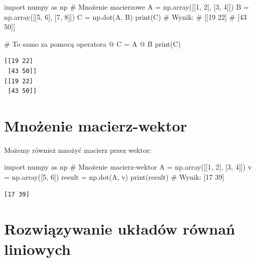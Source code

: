 \documentclass[
  letterpaper,
  DIV=11,
  numbers=noendperiod]{scrreprt}
\newenvironment{Shaded}{\begin{snugshade}}{\end{snugshade}}
\newcommand{\BuiltInTok}[1]{\textcolor[rgb]{0.00,0.23,0.31}{#1}}
\newcommand{\CommentTok}[1]{\textcolor[rgb]{0.37,0.37,0.37}{#1}}
\newcommand{\DecValTok}[1]{\textcolor[rgb]{0.68,0.00,0.00}{#1}}
\newcommand{\ImportTok}[1]{\textcolor[rgb]{0.00,0.46,0.62}{#1}}
\newcommand{\NormalTok}[1]{\textcolor[rgb]{0.00,0.23,0.31}{#1}}
\newcommand{\OperatorTok}[1]{\textcolor[rgb]{0.37,0.37,0.37}{#1}}
\begin{document}
\begin{Shaded}
\begin{Highlighting}[]
\ImportTok{import}\NormalTok{ numpy }\ImportTok{as}\NormalTok{ np}
\CommentTok{\# Mnożenie macierzowe}
\NormalTok{A }\OperatorTok{=}\NormalTok{ np.array([[}\DecValTok{1}\NormalTok{, }\DecValTok{2}\NormalTok{], [}\DecValTok{3}\NormalTok{, }\DecValTok{4}\NormalTok{]])}
\NormalTok{B }\OperatorTok{=}\NormalTok{ np.array([[}\DecValTok{5}\NormalTok{, }\DecValTok{6}\NormalTok{], [}\DecValTok{7}\NormalTok{, }\DecValTok{8}\NormalTok{]])}
\NormalTok{C }\OperatorTok{=}\NormalTok{ np.dot(A, B)}
\BuiltInTok{print}\NormalTok{(C)}
\CommentTok{\# Wynik:}
\CommentTok{\# [[19 22]}
\CommentTok{\#  [43 50]]}

\CommentTok{\# To samo za pomocą operatora @}
\NormalTok{C }\OperatorTok{=}\NormalTok{ A }\OperatorTok{@}\NormalTok{ B}
\BuiltInTok{print}\NormalTok{(C)}
\end{Highlighting}
\end{Shaded}

\begin{verbatim}
[[19 22]
 [43 50]]
[[19 22]
 [43 50]]
\end{verbatim}

\section{Mnożenie macierz-wektor}\label{mnoux17cenie-macierz-wektor}

Możemy również mnożyć macierz przez wektor:

\begin{Shaded}
\begin{Highlighting}[]
\ImportTok{import}\NormalTok{ numpy }\ImportTok{as}\NormalTok{ np}
\CommentTok{\# Mnożenie macierz{-}wektor}
\NormalTok{A }\OperatorTok{=}\NormalTok{ np.array([[}\DecValTok{1}\NormalTok{, }\DecValTok{2}\NormalTok{], [}\DecValTok{3}\NormalTok{, }\DecValTok{4}\NormalTok{]])}
\NormalTok{v }\OperatorTok{=}\NormalTok{ np.array([}\DecValTok{5}\NormalTok{, }\DecValTok{6}\NormalTok{])}
\NormalTok{result }\OperatorTok{=}\NormalTok{ np.dot(A, v)}
\BuiltInTok{print}\NormalTok{(result)  }\CommentTok{\# Wynik: [17 39]}
\end{Highlighting}
\end{Shaded}

\begin{verbatim}
[17 39]
\end{verbatim}

\section{Rozwiązywanie układów równań
liniowych}\label{rozwiux105zywanie-ukux142aduxf3w-ruxf3wnaux144-liniowych}
\end{document}
